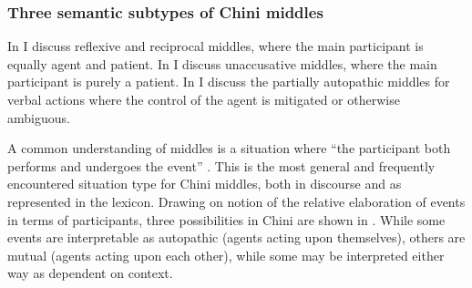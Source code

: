 \documentclass[output=paper]{langscibook}
\begin{document}
\subsubsection{{Three} {semantic} {subtypes} {of} {Chini} {middles}}\label{sec:brooks:4.2.1}

In  I discuss reflexive and reciprocal middles, where the main participant is equally agent and patient. In  I discuss unaccusative middles, where the main participant is purely a patient. In  I discuss the partially autopathic middles for verbal actions where the control of the agent is mitigated or otherwise ambiguous.

\label{sec:brooks:4.2.1.1}

A common understanding of middles is a situation where “the participant both performs and undergoes the event” \citep[1563]{Lichtenberk2007}. This is the most general and frequently encountered situation type for Chini middles, both in discourse and as represented in the lexicon. Drawing on  notion of the relative elaboration of events in terms of participants, three possibilities in Chini are shown in . While some events are interpretable as autopathic (agents acting upon themselves), others are mutual (agents acting upon each other), while some may be interpreted either way as dependent on context.
\end{document}
